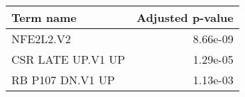 \begin{tabular}{lr}
\toprule
        Term name &  Adjusted p-value \\
\midrule
        NFE2L2.V2 &          8.66e-09 \\
CSR LATE UP.V1 UP &          1.29e-05 \\
 RB P107 DN.V1 UP &          1.13e-03 \\
\bottomrule
\end{tabular}
